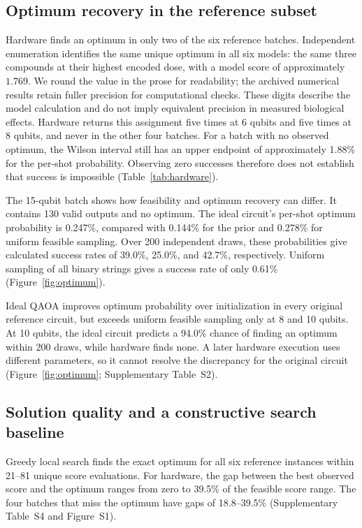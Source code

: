 \documentclass[utf8]{FrontiersinHarvard}
\begin{document}
\subsection{Optimum recovery in the reference subset}
Hardware finds an optimum in only two of the six reference batches. Independent enumeration identifies the same unique optimum in all six models: the same three compounds at their highest encoded dose, with a model score of approximately $1.769$. We round the value in the prose for readability; the archived numerical results retain fuller precision for computational checks. These digits describe the model calculation and do not imply equivalent precision in measured biological effects. Hardware returns this assignment five times at 6 qubits and five times at 8 qubits, and never in the other four batches. For a batch with no observed optimum, the Wilson interval still has an upper endpoint of approximately 1.88\% for the per-shot probability. Observing zero successes therefore does not establish that success is impossible (Table~\ref{tab:hardware}).

The 15-qubit batch shows how feasibility and optimum recovery can differ. It contains 130 valid outputs and no optimum. The ideal circuit's per-shot optimum probability is 0.247\%, compared with 0.144\% for the prior and 0.278\% for uniform feasible sampling. Over 200 independent draws, these probabilities give calculated success rates of 39.0\%, 25.0\%, and 42.7\%, respectively. Uniform sampling of all binary strings gives a success rate of only 0.61\% (Figure~\ref{fig:optimum}).

Ideal QAOA improves optimum probability over initialization in every original reference circuit, but exceeds uniform feasible sampling only at 8 and 10 qubits. At 10 qubits, the ideal circuit predicts a 94.0\% chance of finding an optimum within 200 draws, while hardware finds none. A later hardware execution uses different parameters, so it cannot resolve the discrepancy for the original circuit (Figure~\ref{fig:optimum}; Supplementary Table~S2).

\subsection{Solution quality and a constructive search baseline}
Greedy local search finds the exact optimum for all six reference instances within 21--81 unique score evaluations. For hardware, the gap between the best observed score and the optimum ranges from zero to 39.5\% of the feasible score range. The four batches that miss the optimum have gaps of 18.8--39.5\% (Supplementary Table~S4 and Figure~S1).
\end{document}

